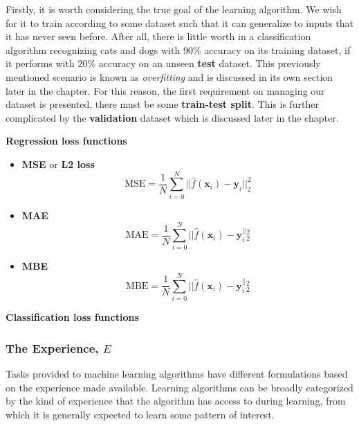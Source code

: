 Firstly, it is worth considering the true goal of the learning algorithm. We
wish for it to train according to some dataset such that it can generalize to
inputs that it has never seen before. After all, there is little worth in a
classification algorithm recognizing cats and dogs with 90\% accuracy on its
training dataset, if it performs with 20\% accuracy on an unseen \textbf{test}
dataset. This previously mentioned scenario is known as \textit{overfitting} and
is discussed in its own section later in the chapter. For this reason, the first
requirement on managing our dataset is presented, there must be some
\textbf{train-test split}. This is further complicated by the
\textbf{validation} dataset which is discussed later in the chapter.

\textbf{Regression loss functions}
\begin{itemize}
    \item \textbf{\Gls{MSE}} or \textbf{L2 loss}
    \begin{equation}
        \text{MSE} = \frac{1}{N}\sum_{i=0}^{N}||\hat{f}(\mathbf{x}_i)-\mathbf{y}_i||^2_2
    \end{equation}
    \item \textbf{\Gls{MAE}}
    \begin{equation}
        \text{MAE} = \frac{1}{N}\sum_{i=0}^{N}||\hat{f}(\mathbf{x}_i)-\mathbf{y}_i^||^2_2
    \end{equation}
    \item \textbf{\Gls{MBE}}
    \begin{equation}
        \text{MBE} = \frac{1}{N}\sum_{i=0}^{N}||\hat{f}(\mathbf{x}_i)-\mathbf{y}_i^||^2_2
    \end{equation}
\end{itemize}

\textbf{Classification loss functions}


\subsubsection{The Experience, $E$\label{sec:ML-experience}}
Tasks provided to machine learning algorithms have different formulations based
on the experience made available. Learning algorithms can be broadly categorized
by the kind of experience that the algorithm has access to during learning, from
which it is generally expected to learn some pattern of interest.

